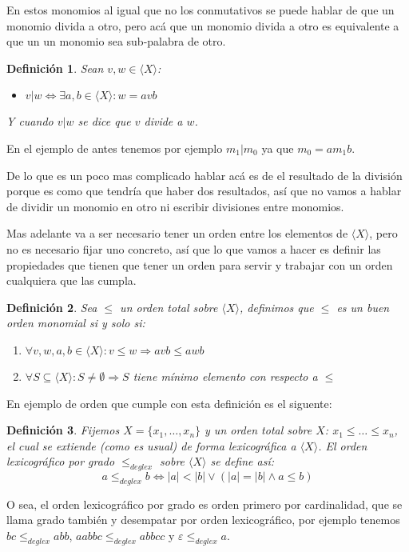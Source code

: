 \documentclass{report}
\theoremstyle{customstyle}
\newtheorem{definition}{Definición}[chapter]
\theoremstyle{factstyle}
\begin{document}
En estos monomios al igual que no los conmutativos se puede hablar de que un monomio divida a otro, pero acá que un monomio divida a otro es equivalente a que un un monomio sea sub-palabra de otro.

\begin{definition}
  Sean $v, w ∈ ⟨X⟩$:
  \begin{itemize}
    \item $v | w ⇔ ∃a , b ∈ ⟨X⟩ : w = avb$
  \end{itemize}
  Y cuando $v | w$ se dice que $v$ divide a $w$.
\end{definition}

En el ejemplo de antes tenemos por ejemplo $m_1 | m_0$ ya que $m_0 = a m_1 b$.

De lo que es un poco mas complicado hablar acá es de el resultado de la división porque es como que tendría que haber dos resultados, así que no vamos a hablar de dividir un monomio en otro ni escribir divisiones entre monomios.

Mas adelante va a ser necesario tener un orden entre los elementos de $⟨X⟩$, pero no es necesario fijar uno concreto, así que lo que vamos a hacer es definir las propiedades que tienen que tener un orden para servir y trabajar con un orden cualquiera que las cumpla.

\begin{definition}
  Sea $≤$ un orden total sobre $⟨X⟩$, definimos que $≤$ es un buen orden monomial si y solo si:
  \begin{enumerate}
    \item $∀v, w, a, b ∈ ⟨X⟩ : v ≤ w ⇒ avb ≤ awb$
    \item $∀S ⊆ ⟨X⟩ : S ≠ ∅ ⇒ S$ tiene mínimo elemento con respecto a $≤$
  \end{enumerate}
\end{definition}

En ejemplo de orden que cumple con esta definición es el siguente:

\begin{definition}
  Fijemos $X = \{x_1, …, x_n\}$ y un orden total sobre $X$: $x_1 ≤ … ≤ x_n$, el cual se extiende (como es usual) de forma lexicográfica a $⟨X⟩$. El orden lexicográfico por grado $ ≤_{deglex}$ sobre $⟨X⟩$ se define así:
  \[ a ≤_{deglex} b ⇔ |a| < |b| ∨ (|a| = |b| ∧ a ≤ b) \]
\end{definition}

O sea, el orden lexicográfico por grado es orden primero por cardinalidad, que se llama grado también y desempatar por orden lexicográfico, por ejemplo tenemos $bc ≤_{deglex} abb$, $aabbc ≤_{deglex} abbcc$ y $ε ≤_{deglex} a$.
\end{document}
